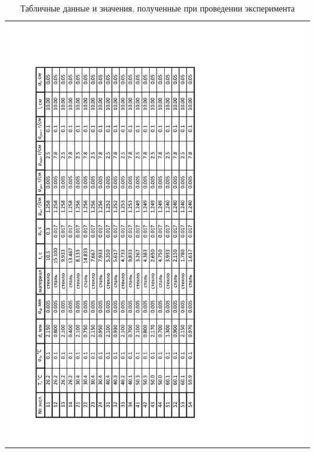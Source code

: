 \documentclass[a4paper,12pt]{article}
\begin{document}
\begin{table}%
	\centering
	\begin{tabular}{c}
	\includegraphics[height=0.9\textheight]{tabel_exp}\\
	\end{tabular}
	\caption{Табличные данные и значения, полученные при проведении эксперимента}
	\label{Tab:tab_exp}
\end{table}
\end{document}
